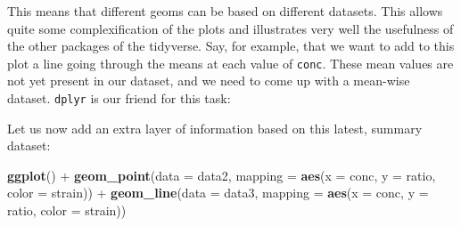 \documentclass[]{book}
\newenvironment{Shaded}{}{}
\newcommand{\CommentTok}[1]{\textcolor[rgb]{0.38,0.63,0.69}{\textit{#1}}}
\newcommand{\DataTypeTok}[1]{\textcolor[rgb]{0.56,0.13,0.00}{#1}}
\newcommand{\KeywordTok}[1]{\textcolor[rgb]{0.00,0.44,0.13}{\textbf{#1}}}
\newcommand{\NormalTok}[1]{#1}
\newcommand{\OperatorTok}[1]{\textcolor[rgb]{0.40,0.40,0.40}{#1}}
\newcommand{\StringTok}[1]{\textcolor[rgb]{0.25,0.44,0.63}{#1}}
\begin{document}
This means that different geoms can be based on different datasets. This allows quite some complexification of the plots and illustrates very well the usefulness of the other packages of the tidyverse. Say, for example, that we want to add to this plot a line going through the means at each value of \texttt{conc}. These mean values are not yet present in our dataset, and we need to come up with a mean-wise dataset. \texttt{dplyr} is our friend for this task:

\begin{Shaded}
\end{Shaded}

Let us now add an extra layer of information based on this latest, summary dataset:

\begin{Shaded}
\begin{Highlighting}[]
 \KeywordTok{ggplot}\NormalTok{() }\OperatorTok{+}
\StringTok{  }\KeywordTok{geom_point}\NormalTok{(}\DataTypeTok{data =}\NormalTok{ data2, }\DataTypeTok{mapping =} \KeywordTok{aes}\NormalTok{(}\DataTypeTok{x =}\NormalTok{ conc, }\DataTypeTok{y =}\NormalTok{ ratio, }\DataTypeTok{color =}\NormalTok{ strain)) }\OperatorTok{+}
\StringTok{  }\KeywordTok{geom_line}\NormalTok{(}\DataTypeTok{data =}\NormalTok{ data3, }\DataTypeTok{mapping =} \KeywordTok{aes}\NormalTok{(}\DataTypeTok{x =}\NormalTok{ conc, }\DataTypeTok{y =}\NormalTok{ ratio, }\DataTypeTok{color =}\NormalTok{ strain))}
\end{Highlighting}
\end{Shaded}
\end{document}
